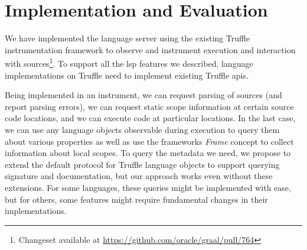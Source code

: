 \documentclass[sigplan,10pt,review,anonymous]{acmart}
\begin{document}



\section{Implementation and Evaluation}
\label{cha:evaluation}

We have implemented the language server using the existing Truffle
instrumentation framework to observe and instrument execution and interaction
with sources\footnote{Changeset available at
  \url{https://github.com/oracle/graal/pull/764}}. To support all the \ac{lsp}
features we described, language implementations on Truffle need to implement
existing Truffle \acp{api}.

Being implemented in an instrument, we can request parsing of sources (and
report parsing errors), we can request static scope information at certain
source code locations, and we can execute code at particular locations. In the
last case, we can use any language objects observable during execution to query
them about various properties as well as use the frameworks \emph{Frame} concept
to collect information about local scopes. To query the metadata we need, we
propose to extend the default protocol for Truffle language objects to support
querying signature and documentation, but our approach works even without these
extensions. For some languages, these queries might be implemented with ease,
but for others, some features might require fundamental changes in their
implementations.
\end{document}
